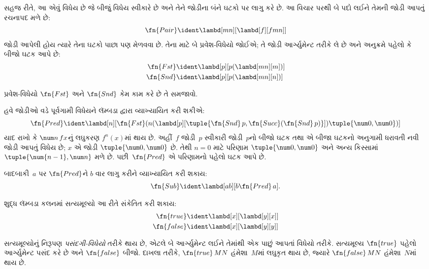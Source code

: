 સહજ રીતે, આ એવું વિધેય છે જે બીજું વિધેય
સ્વીકારે છે અને તેને જોડીના બંને ઘટકો પર લાગુ
કરે છે. આ વિચાર પરથી બે પદો લઈને તેમની
જોડી આપતું રચનાપદ મળે છે:
\[
  \fn{Pair} \ident \lambd[mn][\lambd[f][fmn]]
\]
જોડી આપેલી હોય ત્યારે તેના ઘટકો પાછા પણ
મેળવવા છે. તેના માટે બે પ્રવેશ-વિધેયો જોઈએ;
તે જોડી આર્ગ્યુમેન્ટ તરીકે લે છે અને અનુક્રમે
પહેલો કે બીજો ઘટક આપે છે:
\begin{align*}
  \fn{Fst} & \ident \lambd[p][p(\lambd[mn][m])]\\
  \fn{Snd} & \ident \lambd[p][p(\lambd[mn][n])]
\end{align*}

\begin{prob}
  પ્રવેશ-વિધેયો $\fn{Fst}$ અને $\fn{Snd}$
  કેમ કામ કરે છે તે સમજાવો.
\end{prob}

હવે જોડીઓ વડે પૂર્વગામી વિધેયને લૅમ્બડા દ્વારા વ્યાખ્યાયિત
કરી શકીએ:
\[
  \fn{Pred} \ident \lambd[n][\fn{Fst}(n (\lambd[p][\tuple{\fn{Snd}\, {p}, \fn{Succ}(\fn{Snd}\, {p})}]) \tuple{\num 0, \num 0})]
\]
યાદ રાખો કે $\num n\, f x$નું લઘુકરણ
$f^{n}(x)$માં થાય છે. અહીં~$f$ જોડી~$p$
સ્વીકારી જોડી~$p$નો બીજો ઘટક તથા એ બીજા ઘટકનો
અનુગામી ધરાવતી નવી જોડી આપતું વિધેય છે;
$x$ એ જોડી $\tuple{\num 0,\num 0}$ છે.
તેથી $n=0$ માટે પરિણામ $\tuple{\num 0,\num 0}$
અને અન્ય કિસ્સામાં $\tuple{\num{n-1}, \num n}$
મળે છે. પછી~$\fn{Pred}$ એ પરિણામનો
પહેલો ઘટક આપે છે.

બાદબાકી~$a$ પર $\fn{Pred}$ને $b$ વાર
લાગુ કરીને વ્યાખ્યાયિત કરી શકાય:
\[
\fn{Sub} \ident \lambd[ab][b \fn{Pred}\, a].
\]
\endgroup

\begingroup
\makeatletter{}\makeatother

\label{guunit:OLP-0377}


શુદ્ધ લૅમ્બડા કલનમાં સત્યમૂલ્યો આ રીતે
સંકેતિત કરી શકાય:
\begin{align*}
  \fn{true} & \ident \lambd[x][\lambd[y][x]]\\
  \fn{false} & \ident \lambd[x][\lambd[y][y]]
\end{align*}

સત્યમૂલ્યોનું નિરૂપણ \emph{પસંદગી-વિધેયો} તરીકે
થાય છે, એટલે બે આર્ગ્યુમેન્ટ લઈને તેમાંથી એક
પાછું આપતાં વિધેયો તરીકે. સત્યમૂલ્ય
$\fn{true}$ પહેલો આર્ગ્યુમેન્ટ પસંદ કરે છે અને
$\fn{false}$ બીજો. દાખલા તરીકે,
$\fn{true}\, M N$ હંમેશા~$M$માં લઘુકૃત થાય છે,
જ્યારે $\fn{false}\, M N$ હંમેશા~$N$માં થાય છે.

